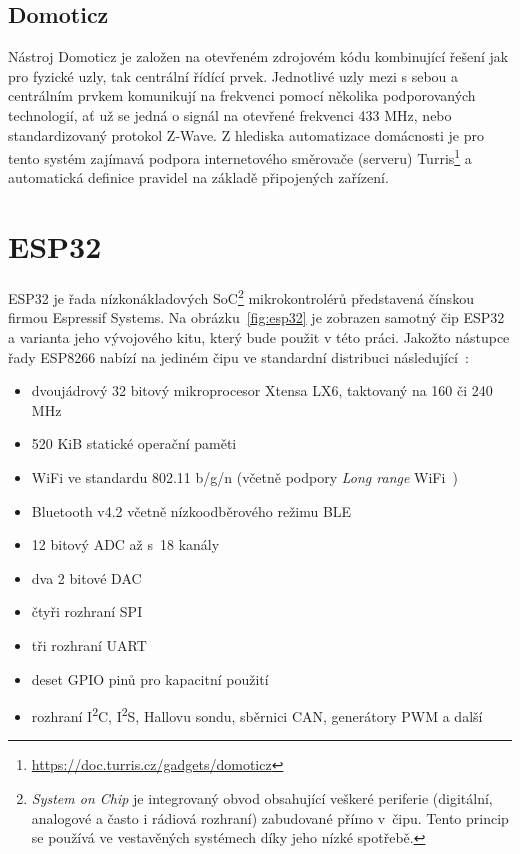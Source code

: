 \subsection{Domoticz}\label{subsec:domoticz}
Nástroj Domoticz je založen na otevřeném zdrojovém kódu kombinující řešení jak pro fyzické uzly, tak centrální řídící
prvek.
Jednotlivé uzly mezi s sebou a centrálním prvkem komunikují na frekvenci pomocí několika podporovaných technologií,
ať už se jedná o signál na otevřené frekvenci 433 MHz, nebo standardizovaný protokol Z-Wave.
Z hlediska automatizace domácnosti je pro tento systém zajímavá podpora internetového směrovače (serveru)
Turris\footnote{\url{https://doc.turris.cz/gadgets/domoticz}} a automatická definice pravidel na základě připojených zařízení.

\section{ESP32}\label{sec:esp32}
ESP32 je řada nízkonákladových SoC\footnote{\textit{System on Chip} je integrovaný obvod obsahující veškeré
periferie (digitální, analogové a často i rádiová rozhraní) zabudované přímo v~čipu.
Tento princip se používá ve vestavěných systémech díky jeho nízké spotřebě.} mikrokontrolérů představená čínskou
firmou Espressif Systems.
Na obrázku~\ref{fig:esp32} je zobrazen samotný čip ESP32 a varianta jeho vývojového kitu, který bude použit v této
práci.
Jakožto nástupce řady ESP8266 nabízí na jediném čipu ve standardní distribuci následující~\cite{ESP32Datasheet}:

\begin{itemize}
    \item dvoujádrový 32 bitový mikroprocesor Xtensa LX6, taktovaný na 160 či 240 MHz
    \item 520 KiB statické operační paměti
    \item WiFi ve standardu 802.11 b/g/n (včetně podpory \textit{Long range} WiFi~\cite{Esp32LongRangeWifi})
    \item Bluetooth v4.2 včetně nízkoodběrového režimu BLE
    \item 12 bitový ADC až s~18 kanály
    \item dva 2 bitové DAC
    \item čtyři rozhraní SPI
    \item tři rozhraní UART
    \item deset GPIO pinů pro kapacitní použití
    \item rozhraní I\textsuperscript{2}C, I\textsuperscript{2}S, Hallovu sondu, sběrnici CAN, generátory PWM a další
\end{itemize}

